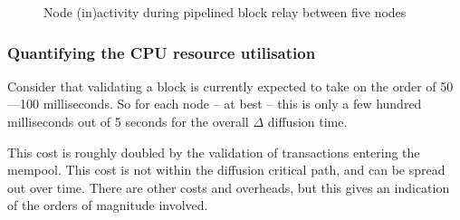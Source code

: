 \documentclass[11pt,a4paper]{article}
\begin{document}
\begin{figure}
\begin{center}
\end{center}
\caption{Node (in)activity during pipelined block relay between five nodes}
\label{fig:serial-block-diffusion}
\end{figure}

\subsubsection{Quantifying the CPU resource utilisation}
Consider that validating a block is currently expected to take on the order of
50---100 milliseconds. So for each node -- at best -- this is only a few
hundred milliseconds out of 5 seconds for the overall $\Delta$ diffusion time.

This cost is roughly doubled by the validation of transactions entering the
mempool. This cost is not within the diffusion critical path, and can be spread
out over time. There are other costs and overheads, but this gives an indication of
the orders of magnitude involved.
\end{document}
